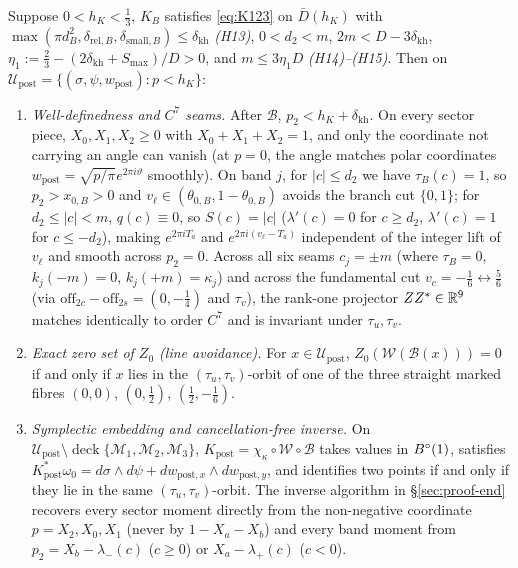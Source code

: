 \begin{theorem}\label{thm:transfer}
Suppose $0<h_K<\frac13$, $K_B$ satisfies \eqref{eq:K123} on $\bar D(h_K)$ with
$\max(\pi d_B^2,\delta_{\mathrm{rel},B},\delta_{\mathrm{small},B})\le\delta_{\mathrm{kh}}$ \emph{(H13)}, $0<d_2<m$,
$2m<D-3\delta_{\mathrm{kh}}$, $\eta_1:=\frac23-(2\delta_{\mathrm{kh}}+S_{\max})/D>0$, and $m\le3\eta_1 D$ \emph{(H14)--(H15)}.
Then on $\mathcal U_{\mathrm{post}}=\{(\sigma,\psi,w_{\mathrm{post}}):p<h_K\}$:
\begin{enumerate}[label=(\roman*)]
\item \emph{Well-definedness and $C^7$ seams.} After $\mathcal B$, $p_2<h_K+\delta_{\mathrm{kh}}$. On every sector piece,
$X_0,X_1,X_2\ge0$ with $X_0+X_1+X_2=1$, and only the coordinate not carrying an angle can vanish (at $p=0$, the angle
matches polar coordinates $w_{\mathrm{post}}=\sqrt{p/\pi}e^{2\pi i\vartheta}$ smoothly). On band $j$, for $|c|\le d_2$
we have $\tau_B(c)=1$, so $p_2>x_{0,B}>0$ and $v_\ell\in(\theta_{0,B},1-\theta_{0,B})$ avoids the branch cut $\{0,1\}$;
for $d_2\le|c|<m$, $q(c)\equiv0$, so $S(c)=|c|$ ($\lambda'(c)=0$ for $c\ge d_2$, $\lambda'(c)=1$ for $c\le-d_2$), making
$e^{2\pi iT_a}$ and $e^{2\pi i(v_\ell-T_a)}$ independent of the integer lift of $v_\ell$ and smooth across $p_2=0$. Across
all six seams $c_j=\pm m$ (where $\tau_B=0$, $k_j(-m)=0$, $k_j(+m)=\kappa_j$) and across the fundamental cut
$v_c=-\frac16\leftrightarrow\frac56$ (via $\mathrm{off}_{2c}-\mathrm{off}_{2s}=(0,-\frac14)$ and $\tau_v$), the
rank-one projector $ZZ^*\in\mathbb{R}^9$ matches identically to order $C^7$ and is invariant under $\tau_u,\tau_v$.
\item \emph{Exact zero set of $Z_0$ (line avoidance).} For $x\in\mathcal U_{\mathrm{post}}$, $Z_0(\mathcal W(\mathcal B(x)))=0$
if and only if $x$ lies in the $(\tau_u,\tau_v)$-orbit of one of the three straight marked fibres
$(0,0)$, $(0,\frac12)$, $(\frac12,-\frac16)$.
\item \emph{Symplectic embedding and cancellation-free inverse.} On $\mathcal U_{\mathrm{post}}\setminus\operatorname{deck}\{\mathcal M_1,\mathcal M_2,\mathcal M_3\}$,
$K_{\mathrm{post}}=\chi_\kappa\circ\mathcal W\circ\mathcal B$ takes values in $B^{\circ}(1)$, satisfies
$K_{\mathrm{post}}^*\omega_0=d\sigma\wedge d\psi+dw_{\mathrm{post},x}\wedge dw_{\mathrm{post},y}$, and identifies two
points if and only if they lie in the same $(\tau_u,\tau_v)$-orbit. The inverse algorithm in \S\ref{sec:proof-end} recovers
every sector moment directly from the non-negative coordinate $p=X_2,X_0,X_1$ (never by $1-X_a-X_b$) and every band
moment from $p_2=X_b-\lambda_-(c)$ ($c\ge0$) or $X_a-\lambda_+(c)$ ($c<0$).
\end{enumerate}
\end{theorem}

